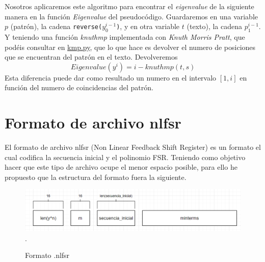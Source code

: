 Nosotros aplicaremos este algoritmo para encontrar el \textit{eigenvalue} de la siguiente manera en la función \textit{Eigenvalue} del pseudocódigo. Guardaremos en una variable $p$ (patrón), la cadena \texttt{reverse($y_0^{i-1}$)}, y en otra variable $t$ (texto), la cadena $p_1^{i-1}$. Y teniendo una función \textit{knuthmp} implementada con \textit{Knuth Morris Pratt}, que podéis consultar en \href{https://github.com/domingoUnican/TFGPedroCastro/blob/main/code/minimal_fsr/knuthMorrisPratt.py}{kmp.py}, que lo que hace es devolver el numero de posiciones que se encuentran del patrón en el texto. Devolveremos
\[Eigenvalue(y^i) = i - knuthmp(t, s)\]
Esta diferencia puede dar como resultado un numero en el intervalo $[1, i]$ en función del numero de coincidencias del patrón.


\section{Formato de archivo nlfsr}
El formato de archivo nlfsr (Non Linear Feedback Shift Register) es un formato el cual codifica la secuencia inicial y el polinomio FSR. Teniendo como objetivo hacer que este tipo de archivo ocupe el menor espacio posible, para ello he propuesto que la estructura del formato fuera la siguiente.
\\
\begin{figure}[h] 
    \centering
    \includegraphics[width=\textwidth,keepaspectratio]{img/nlfsrformat_01.png} .
    \parbox{\linewidth}{\centering Formato .nlfsr}
    \label{fig:mi_imagen}
\end{figure}

